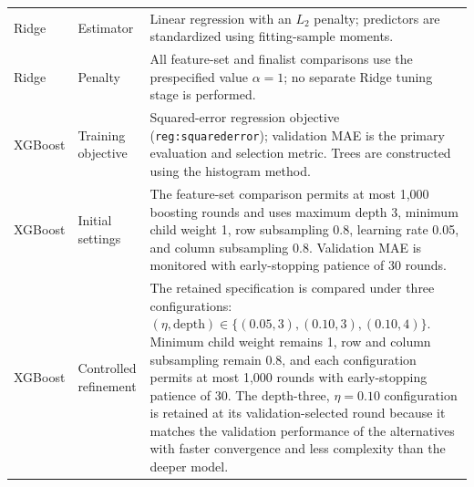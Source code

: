 \begin{longtable}{>{\raggedright\arraybackslash}p{}>{\raggedright\arraybackslash}p{}>{\raggedright\arraybackslash}p{}}
        Ridge
              & Estimator
              & Linear regression with an $L_2$ penalty; predictors are standardized using fitting-sample moments.                                                                                                                                                                                                                                                                                                                                                                                                                              \\
        Ridge
              & Penalty
              & All feature-set and finalist comparisons use the prespecified value $\alpha=1$; no separate Ridge tuning stage is performed.                                                                                                                                                                                                                                                                                                                                                                                                 \\
        XGBoost
              & Training objective
              & Squared-error regression objective (\texttt{reg:squarederror}); validation MAE is the primary evaluation and selection metric. Trees are constructed using the histogram method.                                                                                                                                                                                                                                                                                                                                                  \\
        XGBoost
              & Initial settings
              & The feature-set comparison permits at most 1,000 boosting rounds and uses maximum depth 3, minimum child weight 1, row subsampling 0.8, learning rate 0.05, and column subsampling 0.8. Validation MAE is monitored with early-stopping patience of 30 rounds.                                                                                                                                                                                                                                                                         \\
        XGBoost
              & Controlled refinement
              & The retained specification is compared under three configurations: $(\eta,\text{depth})\in\{(0.05,3),(0.10,3),(0.10,4)\}$. Minimum child weight remains 1, row and column subsampling remain 0.8, and each configuration permits at most 1,000 rounds with early-stopping patience of 30. The depth-three, $\eta=0.10$ configuration is retained at its validation-selected round because it matches the validation performance of the alternatives with faster convergence and less complexity than the deeper model. \\

\end{longtable}
